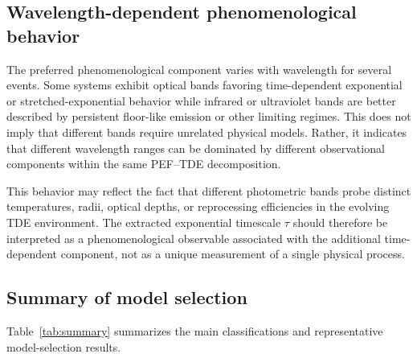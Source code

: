 \documentclass[11pt]{article}
\begin{document}
\subsection{Wavelength-dependent phenomenological behavior}
The preferred phenomenological component varies with wavelength for several events. Some systems exhibit optical bands favoring time-dependent exponential or stretched-exponential behavior while infrared or ultraviolet bands are better described by persistent floor-like emission or other limiting regimes. This does not imply that different bands require unrelated physical models. Rather, it indicates that different wavelength ranges can be dominated by different observational components within the same PEF--TDE decomposition.

This behavior may reflect the fact that different photometric bands probe distinct temperatures, radii, optical depths, or reprocessing efficiencies in the evolving TDE environment. The extracted exponential timescale $\tau$ should therefore be interpreted as a phenomenological observable associated with the additional time-dependent component, not as a unique measurement of a single physical process.

\subsection{Summary of model selection}
Table~\ref{tab:summary} summarizes the main classifications and representative model-selection results.
\end{document}
